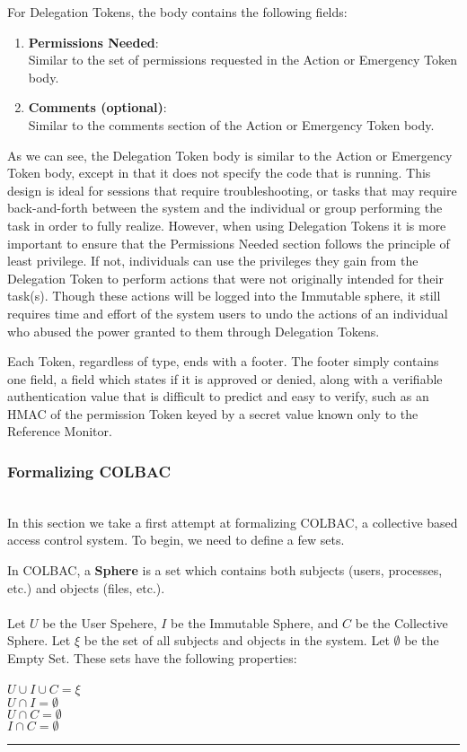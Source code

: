 For Delegation Tokens, the body contains the following fields:
\begin{enumerate}
\item \textbf{Permissions Needed}:\\
Similar to the set of permissions requested in the Action or Emergency Token
body.
\item \textbf{Comments (optional)}:\\
Similar to the comments section of the Action or Emergency Token body.
\end{enumerate}

As we can see, the Delegation Token body is similar to the Action or Emergency
Token body, except in that it does not specify the code that is running. This
design is ideal for sessions that require troubleshooting, or tasks that may
require back-and-forth between the system and the individual or group performing
the task in order to fully realize. However, when using Delegation Tokens it is
more important to ensure that the Permissions Needed section follows the
principle of least privilege. If not, individuals can use the privileges they
gain from the Delegation Token to perform actions that were not originally
intended for their task(s). Though these actions will be logged into the
Immutable sphere, it still requires time and effort of the system users to undo
the actions of an individual who abused the power granted to them through
Delegation Tokens.

Each Token, regardless of type, ends with a footer. The footer simply contains
one field, a field which states if it is approved or denied, along with a
verifiable authentication value that is difficult to predict and easy to verify,
such as an HMAC of the permission Token keyed by a secret value known only to
the Reference Monitor.

\subsubsection{Formalizing COLBAC}
\mbox{}\\
In this section we take a first attempt at formalizing COLBAC, a collective
based access control system. To begin, we need to define a few sets.
\begin{definition}\label{def:spheres}
In COLBAC, a \textbf{Sphere} is a set which contains both subjects (users,
processes, etc.) and objects (files, etc.).\\
\mbox{}\\
Let $U$ be the User Spehere, $I$ be the Immutable Sphere, and $C$ be the
Collective Sphere. Let $\xi$ be the set of all subjects and objects in the
system. Let $\emptyset$ be the Empty Set. These sets have the following
properties:\\
\mbox{}\\
$U \cup I \cup C = \xi$\\
$U \cap I = \emptyset$\\
$U \cap C = \emptyset$\\
$I \cap C = \emptyset$\\
\hrule \mbox{}\\
\end{definition}

